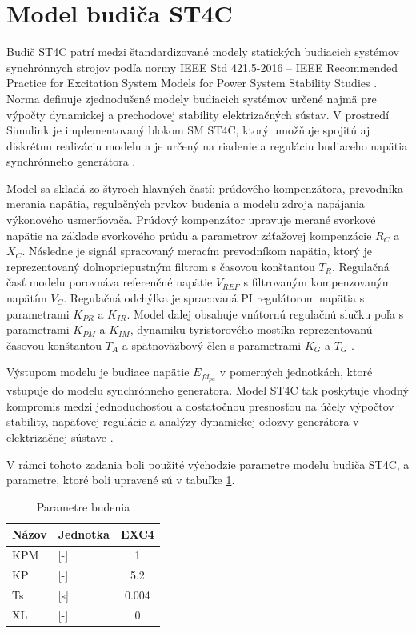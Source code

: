 \section{Model budiča ST4C}
\label{sec:st4c}
Budič ST4C patrí medzi štandardizované modely statických budiacich systémov synchrónnych strojov podľa normy IEEE Std 421.5-2016 – IEEE Recommended Practice for Excitation System Models for Power System Stability Studies \cite{7822884}. Norma definuje zjednodušené modely budiacich systémov určené najmä pre výpočty dynamickej a prechodovej stability elektrizačných sústav. V prostredí Simulink je implementovaný blokom SM ST4C, ktorý umožňuje spojitú aj diskrétnu realizáciu modelu a je určený na riadenie a reguláciu budiaceho napätia synchrónneho generátora \cite{mathworks_smst4c_2026}.

Model sa skladá zo štyroch hlavných častí: prúdového kompenzátora, prevodníka merania napätia, regulačných prvkov budenia a modelu zdroja napájania výkonového usmerňovača. Prúdový kompenzátor upravuje merané svorkové napätie na základe svorkového prúdu a parametrov záťažovej kompenzácie $R_C$ a $X_C$. Následne je signál spracovaný meracím prevodníkom napätia, ktorý je reprezentovaný dolnopriepustným filtrom s časovou konštantou $T_R$. Regulačná časť modelu porovnáva referenčné napätie $V_{REF}$ s filtrovaným kompenzovaným napätím $V_C$. Regulačná odchýlka je spracovaná PI regulátorom napätia s parametrami $K_{PR}$ a $K_{IR}$. Model ďalej obsahuje vnútornú regulačnú slučku poľa s parametrami $K_{PM}$ a $K_{IM}$, dynamiku tyristorového mostíka reprezentovanú časovou konštantou $T_A$ a spätnoväzbový člen s parametrami $K_G$ a $T_G$ \cite{mathworks_smst4c_2026,7822884}.

Výstupom modelu je budiace napätie $E_{fd_{pu}}$ v pomerných jednotkách, ktoré vstupuje do modelu synchrónneho generatora. Model ST4C tak poskytuje vhodný kompromis medzi jednoduchosťou a dostatočnou presnosťou na účely výpočtov stability, napäťovej regulácie a analýzy dynamickej odozvy generátora v elektrizačnej sústave \cite{mathworks_smst4c_2026,7822884}.

V rámci tohoto zadania boli použité východzie parametre modelu budiča ST4C, a parametre, ktoré boli upravené sú v tabuľke \ref{tab:parametre_budenia}.

\begin{table}[htbp]
    \centering
    \begin{tabular}{llc}
        \hline
        Názov & Jednotka & EXC4 \\
        \hline
        KPM & [-] & 1 \\
        KP & [-] & 5.2 \\
        Ts & [s] & 0.004 \\
        XL & [-] & 0 \\
        \hline
    \end{tabular}
    \caption{Parametre budenia}
    \label{tab:parametre_budenia}
\end{table}

